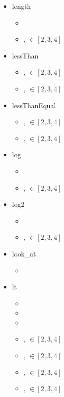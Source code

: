 \documentclass{article}
\begin{document}
\begin{itemize}
\begin{itemize}
\end{itemize}\item length \begin{itemize}
\item {}
\item {},  $\in [2, 3, 4]$

\end{itemize}\item lessThan \begin{itemize}
\item {},  $\in [2, 3, 4]$
\item {},  $\in [2, 3, 4]$

\end{itemize}\item lessThanEqual \begin{itemize}
\item {},  $\in [2, 3, 4]$
\item {},  $\in [2, 3, 4]$

\end{itemize}\item log \begin{itemize}
\item {}
\item {},  $\in [2, 3, 4]$

\end{itemize}\item log2 \begin{itemize}
\item {}
\item {},  $\in [2, 3, 4]$

\end{itemize}\item look\_at \begin{itemize}
\item {}

\end{itemize}\item lt \begin{itemize}
\item {}
\item {}
\item {}
\item {},  $\in [2, 3, 4]$
\item {},  $\in [2, 3, 4]$
\item {},  $\in [2, 3, 4]$
\item {},  $\in [2, 3, 4]$


\end{itemize}
\end{itemize}
\end{document}

